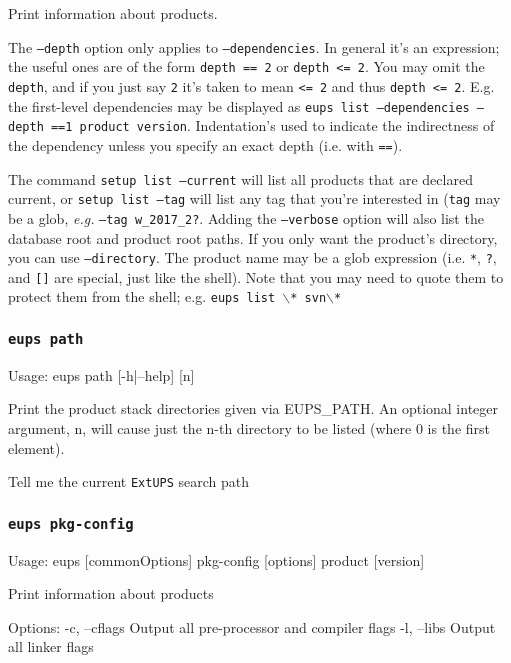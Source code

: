 \documentclass{article}
\newcommand{\code}[1]{\texttt{#1}}
\newcommand{\eups}{\code{ExtUPS}\xspace}
\let\overbatim=\verbatim
\let\oendverbatim=\endverbatim
\renewenvironment{verbatim}
{\center\minipage{16cm}\overbatim}
{\oendverbatim\endminipage\endcenter}
\begin{document}
Print information about products.

The \code{--depth} option only applies to \code{--dependencies}. In general it's
an expression; the useful ones are of the form \code{depth == 2} or \code{depth <= 2}.
You may omit the \code{depth}, and if you just say \code{2} it's taken to mean \code{<= 2}
and thus \code{depth <= 2}.  E.g. the first-level dependencies may be displayed as
\code{eups list --dependencies --depth ==1 product version}.  Indentation's used to
indicate the indirectness of the dependency unless you specify an exact depth (i.e. with \code{==}).

The command \code{setup list --current} will list all products that
are declared current, or \code{setup list --tag} will list any tag that you're interested in (\code{tag}
may be a glob, \textit{e.g.} \code{--tag w\_2017\_2?}. Adding the \code{--verbose} option will also
list the database root and product root paths.  If you only want the product's
directory, you can use \code{--directory}.
The product name may be a glob expression (i.e. \code{*}, \code{?},
and \code{[]} are special, just like the shell).  Note that you may
need to quote them to protect them from the shell; e.g. \code{eups list $\backslash$* svn$\backslash$*}


\subsubsection{\code{eups path}}
\label{eups path}
\begin{verbatim}
Usage: eups path [-h|--help] [n]

Print the product stack directories given via EUPS_PATH.  An
optional integer argument, n, will cause just the n-th directory
to be listed (where 0 is the first element).

\end{verbatim}

Tell me the current \eups search path


\subsubsection{\code{eups pkg-config}}
\begin{verbatim}
Usage:
    eups [commonOptions] pkg-config [options] product [version]

Print information about products

Options:
   -c, --cflags            Output all pre-processor and compiler flags
   -l, --libs              Output all linker flags
\end{verbatim}
\end{document}

